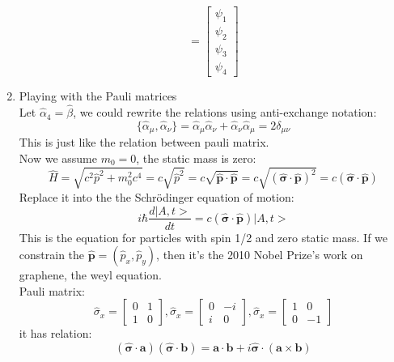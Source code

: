 \documentclass[12pt]{article}
\numberwithin{equation}{section}
\begin{document}
\begin{enumerate}
\[	=\begin{bmatrix}\psi_1 \\ \psi_2 \\ \psi_3 \\ \psi_4 \end{bmatrix}\]
\item Playing with the Pauli matrices \\
	Let $\hat{\alpha}_4=\hat{\beta}$, we could rewrite the relations using anti-exchange notation:
	\begin{equation}\{\hat{\alpha}_\mu, \hat{\alpha}_\nu \}=
	\hat{\alpha}_\mu \hat{\alpha}_\nu + \hat{\alpha}_\nu \hat{\alpha}_\mu = 
	2 \delta_{\mu \nu}\end{equation}
	This is just like the relation between pauli matrix.\\
	Now we assume $m_0=0$, the static mass is zero:
	\begin{equation}\hat{H}=\sqrt{c^2\hat{p}^2+m_0^2c^4}
	=c\sqrt{\hat{p}^2}=c\sqrt{\hat{\mathbf{p}}\cdot\hat{\mathbf{p}}}
	=c\sqrt{(\hat{\mathbf{\sigma}}\cdot\hat{\mathbf{p}})^2}
	=c(\hat{\mathbf{\sigma}}\cdot\hat{\mathbf{p}})\end{equation}
	Replace it into the the Schr\"{o}dinger equation of motion:
	\begin{equation}i\hbar\frac{d|A,t>}{dt}
	=c(\hat{\mathbf{\sigma}}\cdot\hat{\mathbf{p}})|A,t>\end{equation}
	This is the equation for particles with spin 1/2 and zero static mass. If we constrain the $\hat{\mathbf{p}}=(\hat{p}_x,\hat{p}_y)$, then it's the 2010 Nobel Prize's work on graphene, the weyl equation. \\
	Pauli matrix:
	\begin{equation}
	\hat{\sigma}_x=\begin{bmatrix}0&1\\1&0\end{bmatrix},
	\hat{\sigma}_x=\begin{bmatrix}0&-i\\i&0\end{bmatrix},
	\hat{\sigma}_x=\begin{bmatrix}1&0\\0&-1\end{bmatrix}
	\end{equation}
	it has relation:
	\begin{equation}
	(\hat{\mathbf{\sigma}}\cdot\mathbf{a})(\hat{\mathbf{\sigma}}\cdot\mathbf{b})
	=\mathbf{a}\cdot\mathbf{b}+i\hat{\mathbf{\sigma}}\cdot(\mathbf{a}\times\mathbf{b})
	\end{equation}

\end{enumerate}
\end{document}

